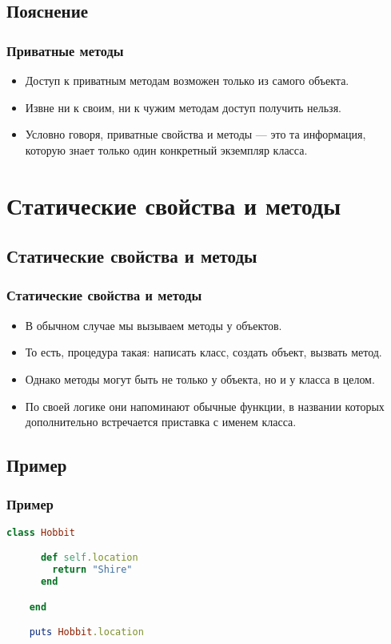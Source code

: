 \documentclass[compress,red]{beamer}
\begin{document}
\subsection{Пояснение}
\begin{frame}[fragile]
  \frametitle{Приватные методы}
  \begin{itemize}
    \item Доступ к приватным методам возможен только из самого объекта.
    \item Извне ни к своим, ни к чужим методам доступ получить нельзя.
    \item Условно говоря, приватные свойства и методы --- это та информация, которую знает только один конкретный экземпляр класса.
  \end{itemize}
\end{frame}

\section{Статические свойства и методы}
\subsection{Статические свойства и методы}
\begin{frame}[fragile]
  \frametitle{Статические свойства и методы}
  \begin{itemize}
    \item В обычном случае мы вызываем методы у объектов.
    \item То есть, процедура такая: написать класс, создать объект, вызвать метод.
    \item Однако методы могут быть не только у объекта, но и у класса в целом.
    \item По своей логике они напоминают обычные функции, в названии которых дополнительно встречается приставка с именем класса.
  \end{itemize}
\end{frame}

\subsection{Пример}
\begin{frame}[fragile]
  \frametitle{Пример}
  \scriptsize{
  \begin{lstlisting}[language=ruby,basicstyle=\footnotesize,label=ruby6,caption=Пример статического метода]
    class Hobbit

      def self.location
        return "Shire"
      end

    end

    puts Hobbit.location
  \end{lstlisting}
  }
  
\end{frame}
\end{document}
